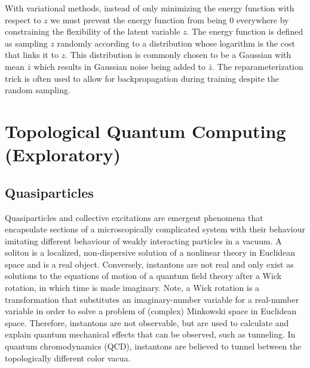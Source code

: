 \documentclass{article}
\begin{document}
    With variational methods, instead of only minimizing the energy function with respect to $z$ we must prevent the energy function from being 0 everywhere by constraining the flexibility of the latent variable $z$. The energy function is defined as sampling $z$ randomly according to a distribution whose logarithm is the cost that links it to $z$. This distribution is commonly chosen to be a Gaussian with mean $\bar z$ which results in Gaussian noise being added to $\bar z$. The reparameterization trick is often used to allow for backpropagation during training despite the random sampling.

    \section{Topological Quantum Computing (Exploratory)}

    \subsection{Quasiparticles}
    
    
    
    
    
    Quasiparticles and collective excitations are emergent phenomena that encapsulate sections of a microscopically complicated system with their behaviour imitating different behaviour of weakly interacting particles in a vacuum. 
    A soliton is a localized, non-dispersive solution of a nonlinear theory in Euclidean space and is a real object. Conversely, instantons are not real and only exist as solutions to the equations of motion of a quantum field theory after a Wick rotation, in which time is made imaginary. Note, a Wick rotation is a transformation that substitutes an imaginary-number variable for a real-number variable in order to solve a problem of (complex) Minkowski space in Euclidean space. Therefore, instantons are not observable, but are used to calculate and explain quantum mechanical effects that can be observed, such as tunneling. In quantum chromodynamics (QCD), instantons are believed to tunnel between the topologically different color vacua.
    
\end{document}

